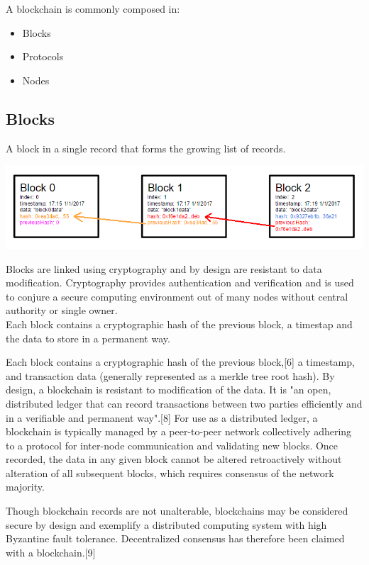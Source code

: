 A blockchain is commonly composed in:
\begin{itemize}
    \item Blocks
    \item Protocols
    \item Nodes
\end{itemize}

\subsection{Blocks}

A block in a single record that forms the growing list of records.

\includegraphics[scale=0.45]{images/blockchain_basic.png}

Blocks are linked using cryptography and by design are resistant to data modification. Cryptography provides authentication and verification and is used to conjure a secure computing environment out of many nodes without central authority or single owner.\\
Each block contains a cryptographic hash of the previous block, a timestap and the data to store in a permanent way.

Each block contains a cryptographic hash of the previous block,[6] a timestamp, and transaction data (generally represented as a merkle tree root hash). By design, a blockchain is resistant to modification of the data. It is "an open, distributed ledger that can record transactions between two parties efficiently and in a verifiable and permanent way".[8] For use as a distributed ledger, a blockchain is typically managed by a peer-to-peer network collectively adhering to a protocol for inter-node communication and validating new blocks. Once recorded, the data in any given block cannot be altered retroactively without alteration of all subsequent blocks, which requires consensus of the network majority.

Though blockchain records are not unalterable, blockchains may be considered secure by design and exemplify a distributed computing system with high Byzantine fault tolerance. Decentralized consensus has therefore been claimed with a blockchain.[9]

